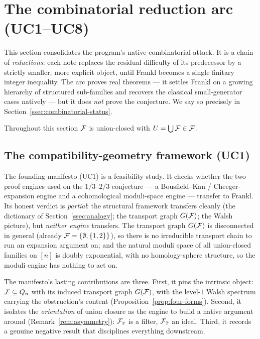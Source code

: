 \section{The combinatorial reduction arc (UC1--UC8)}
\label{sec:combinatorial}

This section consolidates the program's native combinatorial attack. It
is a chain of \emph{reductions}: each note replaces the residual
difficulty of its predecessor by a strictly smaller, more explicit
object, until Frankl becomes a single finitary integer inequality. The
arc proves real theorems --- it settles Frankl on a growing hierarchy
of structured sub-families and recovers the classical small-generator
cases natively --- but it does \emph{not} prove the conjecture. We say
so precisely in Section~\ref{ssec:combinatorial-status}.

Throughout this section $\mathcal{F}$ is union-closed with $U=\bigcup\mathcal{F}\in\mathcal{F}$.

\subsection{The compatibility-geometry framework (UC1)}
\label{ssec:uc1-uc2}

The founding manifesto (UC1) is a feasibility study. It checks whether
the two proof engines used on the $1/3$--$2/3$ conjecture --- a
Bousfield--Kan / Cheeger-expansion engine and a cohomological
moduli-space engine --- transfer to Frankl. Its honest verdict is
\emph{partial}: the structural framework transfers cleanly (the
dictionary of Section~\ref{ssec:analogy}; the transport graph $G(\mathcal{F})$;
the Walsh picture), but \emph{neither engine} transfers. The transport
graph $G(\mathcal{F})$ is disconnected in general (already
$\mathcal{F}=\{\emptyset,\{1,2\}\}$), so there is no irreducible transport chain
to run an expansion argument on; and the natural moduli space of all
union-closed families on $[n]$ is doubly exponential, with no
homology-sphere structure, so the moduli engine has nothing to act on.

The manifesto's lasting contributions are three. First, it pins the
intrinsic object: $\mathcal{F}\subseteq Q_n$ with its induced transport graph
$G(\mathcal{F})$, with the level-$1$ Walsh spectrum carrying the obstruction's
content (Proposition~\ref{prop:four-forms}). Second, it isolates the
\emph{orientation} of union closure as the engine to build a native
argument around (Remark~\ref{rem:asymmetry}): $\mathcal{F}_x$ is a filter,
$\mathcal{F}_{\bar x}$ an ideal. Third, it records a genuine negative result
that disciplines everything downstream.

